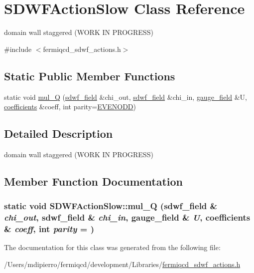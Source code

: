 \hypertarget{class_s_d_w_f_action_slow}{
\section{SDWFActionSlow Class Reference}
\label{class_s_d_w_f_action_slow}
}


domain wall staggered (WORK IN PROGRESS)  


{\ttfamily \#include $<$fermiqcd\_\-sdwf\_\-actions.h$>$}\subsection*{Static Public Member Functions}
\begin{DoxyCompactItemize}
\item 
static void \hyperlink{class_s_d_w_f_action_slow_a45575ccf7edbc4dbe1d326efc8d07ff8}{mul\_\-Q} (\hyperlink{classsdwf__field}{sdwf\_\-field} \&chi\_\-out, \hyperlink{classsdwf__field}{sdwf\_\-field} \&chi\_\-in, \hyperlink{classgauge__field}{gauge\_\-field} \&U, \hyperlink{classcoefficients}{coefficients} \&coeff, int parity=\hyperlink{mdp__global__vars_8h_a4c9de81f2de5a74b588107b6c0afb9ee}{EVENODD})
\end{DoxyCompactItemize}


\subsection{Detailed Description}
domain wall staggered (WORK IN PROGRESS) 

\subsection{Member Function Documentation}
\hypertarget{class_s_d_w_f_action_slow_a45575ccf7edbc4dbe1d326efc8d07ff8}{
\subsubsection[{mul\_\-Q}]{\setlength{\rightskip}{0pt plus 5cm}static void SDWFActionSlow::mul\_\-Q ({\bf sdwf\_\-field} \& {\em chi\_\-out}, \/  {\bf sdwf\_\-field} \& {\em chi\_\-in}, \/  {\bf gauge\_\-field} \& {\em U}, \/  {\bf coefficients} \& {\em coeff}, \/  int {\em parity} = {})}}
\label{class_s_d_w_f_action_slow_a45575ccf7edbc4dbe1d326efc8d07ff8}


The documentation for this class was generated from the following file:\begin{DoxyCompactItemize}
\item 
/Users/mdipierro/fermiqcd/development/Libraries/\hyperlink{fermiqcd__sdwf__actions_8h}{fermiqcd\_\-sdwf\_\-actions.h}\end{DoxyCompactItemize}
